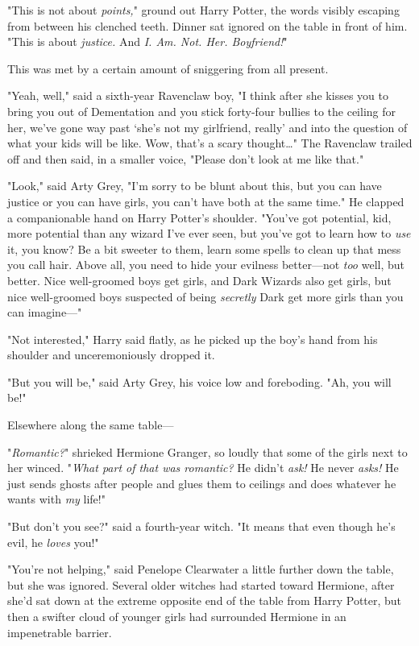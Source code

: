 "This is not about \emph{points,}" ground out Harry Potter, the words visibly
escaping from between his clenched teeth. Dinner sat ignored on the table in
front of him. "This is about \emph{justice.} And \emph{I\@. Am. Not. Her.
Boyfriend!}"

This was met by a certain amount of sniggering from all present.

"Yeah, well," said a sixth-year Ravenclaw boy, "I think after she kisses you to
bring you out of Dementation and you stick forty-four bullies to the ceiling
for her, we've gone way past `she's not my girlfriend, really' and into the
question of what your kids will be like. Wow, that's a scary thought{\ldots}"
The Ravenclaw trailed off and then said, in a smaller voice, "Please don't look
at me like that."

"Look," said Arty Grey, "I'm sorry to be blunt about this, but you can have
justice or you can have girls, you can't have both at the same time." He
clapped a companionable hand on Harry Potter's shoulder. "You've got potential,
kid, more potential than any wizard I've ever seen, but you've got to learn how
to \emph{use} it, you know? Be a bit sweeter to them, learn some spells to
clean up that mess you call hair. Above all, you need to hide your evilness
better---not \emph{too} well, but better. Nice well-groomed boys get girls, and
Dark Wizards also get girls, but nice well-groomed boys suspected of being
\emph{secretly} Dark get more girls than you can imagine---"

"Not interested," Harry said flatly, as he picked up the boy's hand from his
shoulder and unceremoniously dropped it.

"But you will be," said Arty Grey, his voice low and foreboding. "Ah, you will
be!"

Elsewhere along the same table---

"\emph{Romantic?}" shrieked Hermione Granger, so loudly that some of the girls
next to her winced. "\emph{What part of that was romantic?} He didn't
\emph{ask!} He never \emph{asks!} He just sends ghosts after people and glues
them to ceilings and does whatever he wants with \emph{my} life!"

"But don't you see?" said a fourth-year witch. "It means that even though he's
evil, he \emph{loves} you!"

"You're not helping," said Penelope Clearwater a little further down the table,
but she was ignored. Several older witches had started toward Hermione, after
she'd sat down at the extreme opposite end of the table from Harry Potter, but
then a swifter cloud of younger girls had surrounded Hermione in an
impenetrable barrier.

